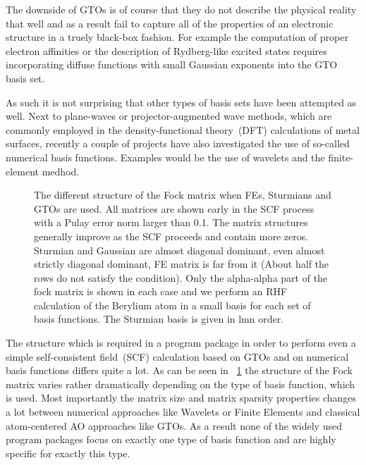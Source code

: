 The downside of GTOs is of course that they do not describe the physical
reality that well and as a result fail to capture all of the properties
of an electronic structure in a truely black-box fashion.
For example the computation of proper electron affinities or the description
of Rydberg-like excited states requires incorporating diffuse functions
with small Gaussian exponents into the GTO basis set.

As such it is not surprising that other types of basis sets have been attempted as well.
Next to plane-waves or projector-augmented wave methods,
which are commonly employed in the density-functional theory~(DFT)
calculations of metal surfaces,
recently a couple of projects have also investigated the use
of so-called numerical basis functions.
Examples would be the use of wavelets and the finite-element medhod.


\begin{figure}
	\centering
	\caption{The different structure of the Fock matrix when FEs,
		Sturmians and GTOs are used.
		All matrices are shown early in the SCF process with a Pulay error norm
		larger than 0.1.
		The matrix structures generally improve as the SCF proceeds and contain more zeros.
		Sturmian and Gaussian are almost diagonal dominant,
		even almost strictly diagonal dominant,
		FE matrix is far from it (About half the rows do not satisfy the condition).
		Only the alpha-alpha part of the fock matrix is shown in each case
		and we perform an RHF calculation of the Berylium atom in a small basis
		for each set of basis functions.
		The Sturmian basis is given in lmn order.
	}
	\label{fig:FockStructure}
\end{figure}

The structure which is required in a program package in order to perform even a simple
self-consistent field~(SCF) calculation
based on GTOs and on numerical basis functions differs quite a lot.
As can be seen in \fig~\ref{fig:FockStructure} the structure of the Fock matrix
varies rather dramatically depending on the type of basis function,
which is used.
Most importantly the matrix size and matrix sparsity properties
changes a lot between numerical approaches like
Wavelets or Finite Elements and classical atom-centered AO approaches like GTOs.
As a result none of the widely used program packages
focus on exactly one type of basis function and are highly specific for exactly this type.

